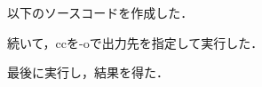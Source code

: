 \documentclass{ujarticle}
\begin{document}
以下のソースコードを作成した．

続いて，ccを-oで出力先を指定して実行した．

最後に実行し，結果を得た．

\end{document}
